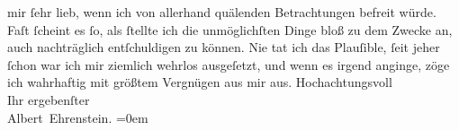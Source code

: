 \begin{ledgroupsized}[t]{13cm}
                    mir ſehr lieb, wenn ich von allerhand quälenden Betrachtungen befreit würde.
                    Faſt ſcheint es ſo, als ſtellte ich die unmöglichſten Dinge bloß zu dem Zwecke
                    an, auch nachträglich entſchuldigen zu können. Nie tat ich das Plauſible, ſeit
                    jeher ſchon war ich mir ziemlich wehrlos ausgeſetzt, und wenn es irgend anginge,
                    zöge ich {\pb}wahrhaftig mit größtem Vergnügen aus mir
                    aus.\pend
           \pstart
           Hochachtungsvoll{\\[\baselineskip]}Ihr ergebenſter{\\[\baselineskip]}\spacefill\mbox{Albert Ehrenstein.}\pend
           \leftskip=0em{}          \endnumbering{}\end{ledgroupsized}  \newcommand{\dateiname}{L01840}\newcommand{\titel}{Albert Ehrenstein an Arthur Schnitzler, 6. 5. 1909}\newcommand{\editorInnen}{Martin Anton Müller und Gerd-Hermann Susen}
            \footnotesize
\begin{ledgroupsized}[t]{11.5cm}
\end{ledgroupsized}
         
      